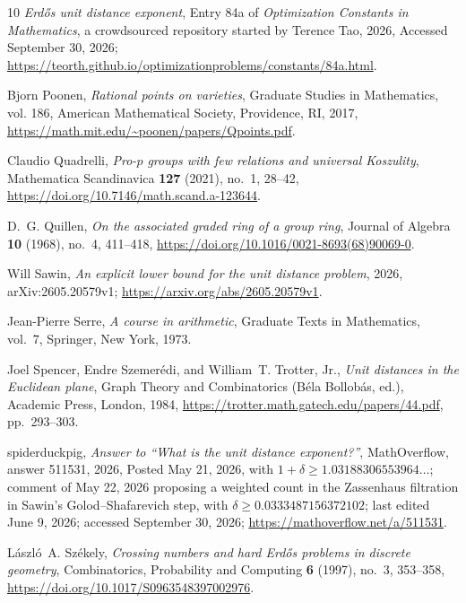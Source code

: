 \documentclass[11pt]{amsart}
\numberwithin{equation}{section}
\theoremstyle{definition}
\theoremstyle{remark}
\begin{document}
\begin{thebibliography}{10}
\emph{Erd{\H{o}}s unit distance exponent}, Entry 84a of \emph{Optimization
  Constants in Mathematics}, a crowdsourced repository started by Terence Tao,
  2026, Accessed September 30, 2026;
  \url{https://teorth.github.io/optimizationproblems/constants/84a.html}.

Bjorn Poonen, \emph{Rational points on varieties}, Graduate Studies in
  Mathematics, vol. 186, American Mathematical Society, Providence, RI, 2017,
  \url{https://math.mit.edu/~poonen/papers/Qpoints.pdf}.

Claudio Quadrelli, \emph{Pro-{$p$} groups with few relations and universal
  {Koszulity}}, Mathematica Scandinavica \textbf{127} (2021), no.~1, 28--42,
  \url{https://doi.org/10.7146/math.scand.a-123644}.

D.~G. Quillen, \emph{On the associated graded ring of a group ring}, Journal of
  Algebra \textbf{10} (1968), no.~4, 411--418,
  \url{https://doi.org/10.1016/0021-8693(68)90069-0}.

Will Sawin, \emph{An explicit lower bound for the unit distance problem}, 2026,
  arXiv:2605.20579v1; \url{https://arxiv.org/abs/2605.20579v1}.

Jean-Pierre Serre, \emph{A course in arithmetic}, Graduate Texts in
  Mathematics, vol.~7, Springer, New York, 1973.

Joel Spencer, Endre Szemer{\'e}di, and William~T. Trotter, Jr., \emph{Unit
  distances in the {Euclidean} plane}, Graph Theory and Combinatorics (B{\'e}la
  Bollob{\'a}s, ed.), Academic Press, London, 1984,
  \url{https://trotter.math.gatech.edu/papers/44.pdf}, pp.~293--303.

{spiderduckpig}, \emph{Answer to ``{W}hat is the unit distance exponent?''},
  MathOverflow, answer 511531, 2026, Posted May 21, 2026, with
  $1+\delta\ge1.03188306553964\ldots$; comment of May 22, 2026 proposing a
  weighted count in the Zassenhaus filtration in Sawin's Golod--Shafarevich
  step, with $\delta\ge0.0333487156372102$; last edited June 9, 2026; accessed
  September 30, 2026; \url{https://mathoverflow.net/a/511531}.

L{\'a}szl{\'o}~A. Sz{\'e}kely, \emph{Crossing numbers and hard {Erd{\H{o}}s}
  problems in discrete geometry}, Combinatorics, Probability and Computing
  \textbf{6} (1997), no.~3, 353--358,
  \url{https://doi.org/10.1017/S0963548397002976}.


\end{thebibliography}
\end{document}
